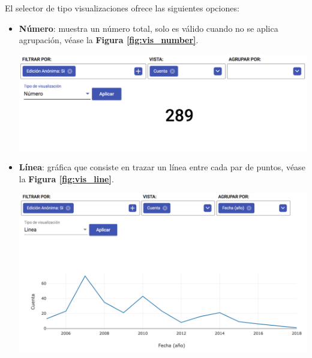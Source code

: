 \begin{enumerate}
  El selector de tipo visualizaciones ofrece las siguientes opciones:
  \begin{itemize}
    \item\textbf{Número}: muestra un número total, solo es válido cuando no se aplica agrupación, véase la \textbf{Figura \ref{fig:vis_number}}.
    
        \begin{center}
          \bigbreak
          \includegraphics[scale=0.35]{images/marco_aplicativo/vis_number.png}
          \label{fig:vis_number}
          \bigbreak
        \end{center}

    \item\textbf{Línea}: gráfica que consiste en trazar un línea entre cada par de puntos, véase la \textbf{Figura \ref{fig:vis_line}}.
        \begin{center}
          \bigbreak
          \includegraphics[scale=0.35]{images/marco_aplicativo/vis_line.png}
          \label{fig:vis_line}
          \bigbreak
        \end{center}


\end{itemize}
\end{enumerate}
